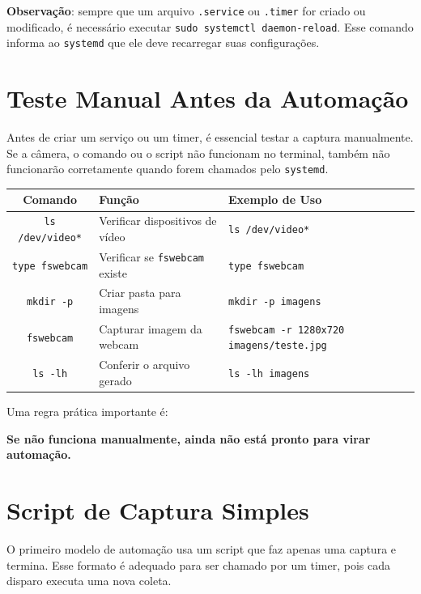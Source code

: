 \documentclass[12pt]{article}
\begin{document}
\textbf{Observação}: sempre que um arquivo \texttt{.service} ou \texttt{.timer} for criado ou modificado, é necessário executar \texttt{sudo systemctl daemon-reload}. Esse comando informa ao \texttt{systemd} que ele deve recarregar suas configurações.

\section{Teste Manual Antes da Automação}

Antes de criar um serviço ou um timer, é essencial testar a captura manualmente. Se a câmera, o comando ou o script não funcionam no terminal, também não funcionarão corretamente quando forem chamados pelo \texttt{systemd}.

\begin{cmdbox}
\begin{tabularx}{\linewidth}{@{}C >{\raggedright\arraybackslash}X >{\raggedright\arraybackslash}X@{}}
\toprule
\textbf{Comando} & \textbf{Função} & \textbf{Exemplo de Uso} \\
\midrule
\texttt{ls /dev/video*} & Verificar dispositivos de vídeo & \texttt{ls /dev/video*} \\
\texttt{type fswebcam} & Verificar se \texttt{fswebcam} existe & \texttt{type fswebcam} \\
\texttt{mkdir -p} & Criar pasta para imagens & \texttt{mkdir -p imagens} \\
\texttt{fswebcam} & Capturar imagem da webcam & \texttt{fswebcam -r 1280x720 imagens/teste.jpg} \\
\texttt{ls -lh} & Conferir o arquivo gerado & \texttt{ls -lh imagens} \\
\bottomrule
\end{tabularx}
\end{cmdbox}

Uma regra prática importante é:

\begin{center}
\textbf{Se não funciona manualmente, ainda não está pronto para virar automação.}
\end{center}

\section{Script de Captura Simples}

O primeiro modelo de automação usa um script que faz apenas uma captura e termina. Esse formato é adequado para ser chamado por um timer, pois cada disparo executa uma nova coleta.
\end{document}
